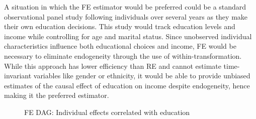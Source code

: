\newpage

A situation in which the FE estimator would be preferred could be a standard observational panel study following individuals over several years as they make their own education decisions. This study would track education levels and income while controlling for age and marital status. Since unobserved individual characteristics influence both educational choices and income, FE would be necessary to eliminate endogeneity through the use of within-transformation. While this approach has lower efficiency than RE and cannot estimate time-invariant variables like gender or ethnicity, it would be able to provide unbiased estimates of the causal effect of education on income despite endogeneity, hence making it the preferred estimator.

\begin{figure}[H]
\centering
{}
\caption{FE DAG: Individual effects correlated with education}
\label{fig:fe_dag}
\end{figure}
\vspace{-2em}